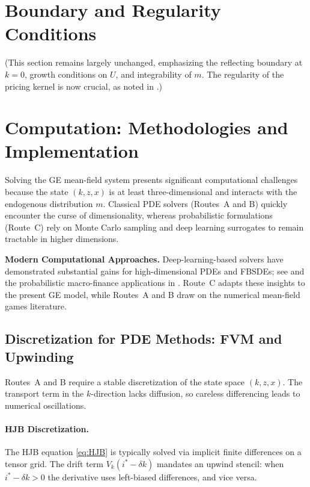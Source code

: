 \documentclass[11pt,letterpaper,oneside]{article}
\begin{document}
\section{Boundary and Regularity Conditions}

(This section remains largely unchanged, emphasizing the reflecting boundary at $k=0$, growth conditions on $U$, and integrability of $m$. The regularity of the pricing kernel is now crucial, as noted in .)

\section{Computation: Methodologies and Implementation}

Solving the GE mean-field system presents significant computational challenges because the state $(k,z,x)$ is at least three-dimensional and interacts with the endogenous distribution $m$. Classical PDE solvers (Routes~A and B) quickly encounter the curse of dimensionality, whereas probabilistic formulations (Route~C) rely on Monte Carlo sampling and deep learning surrogates to remain tractable in higher dimensions.

\begin{tcolorbox}[literaturestyle]
\textbf{Modern Computational Approaches.} Deep-learning-based solvers have demonstrated substantial gains for high-dimensional PDEs and FBSDEs; see \cite{han_2018_deep_bsde} and the probabilistic macro-finance applications in \cite{huang_2025_probabilistic}. Route~C adapts these insights to the present GE model, while Routes~A and B draw on the numerical mean-field games literature.
\end{tcolorbox}

\subsection{Discretization for PDE Methods: FVM and Upwinding}\label{sec:FVM}

Routes~A and B require a stable discretization of the state space $(k,z,x)$. The transport term in the $k$-direction lacks diffusion, so careless differencing leads to numerical oscillations.

\paragraph{HJB Discretization.} The HJB equation \eqref{eq:HJB} is typically solved via implicit finite differences on a tensor grid. The drift term $V_k(i^* - \delta k)$ mandates an upwind stencil: when $i^* - \delta k > 0$ the derivative uses left-biased differences, and vice versa.
\end{document}

